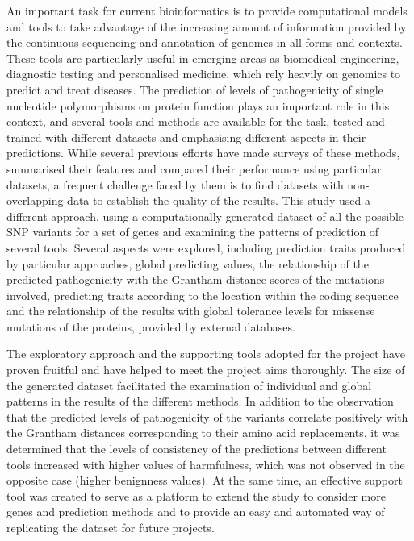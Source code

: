 \documentclass[12pt,MSc,wordcount,anon]{muthesis}
\begin{document}
\begin{flushleft}
An important task for current bioinformatics is to provide computational models and tools to take advantage of the increasing amount of information provided by the continuous sequencing and annotation of genomes in all forms and contexts. These tools are particularly useful in emerging areas as biomedical engineering, diagnostic testing and personalised medicine, which rely heavily on genomics to predict and treat diseases. The prediction of levels of pathogenicity of single nucleotide polymorphisms on protein function plays an important role in this context, and several tools and methods are available for the task, tested and trained with different datasets and emphasising different aspects in their predictions. While several previous efforts have made surveys of these methods, summarised their features and compared their performance using particular datasets, a frequent challenge faced by them is to find datasets with non-overlapping data to establish the quality of the results. This study used a different approach, using a computationally generated dataset of all the possible SNP variants for a set of genes and examining the patterns of prediction of several tools.
Several aspects were explored, including prediction traits produced by particular approaches, global predicting values, the relationship of the predicted pathogenicity with the Grantham distance scores of the mutations involved, predicting traits according to the location within the coding sequence and the relationship of the results with global tolerance levels for missense mutations of the proteins, provided by external databases.

The exploratory approach and the supporting tools adopted for the project have proven fruitful and have helped to meet the project aims thoroughly. The size of the generated dataset facilitated the examination of individual and global patterns in the results of the different methods. In addition to the observation that the predicted levels of pathogenicity of the variants correlate positively with the Grantham distances corresponding to their amino acid replacements, it was determined that the levels of consistency of the predictions between different tools increased with higher values of harmfulness, which was not observed in the opposite case (higher benignness values).
At the same time, an effective support tool was created to serve as a platform to extend the study to consider more genes and prediction methods and to provide an easy and automated way of replicating the dataset for future projects.


\end{flushleft}
\end{document}
